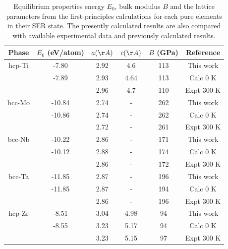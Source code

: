 \newpage
\begin{table}[H]
	\caption{Equilibrium properties energy $E_{0}$, bulk modulus $B$ and the lattice parameters from the first-principles calculations for each pure elements in their SER state. The presently calculated results are also compared with available experimental data and previously calculated results.}
	\centering
	\begin{tabular}{ c c c c c c }
		\hline
		Phase & $E_{0}$ (eV/atom) & $a (\AA)$ & $c (\AA)$ & $B$ (GPa) & Reference \\
		\hline
		hcp-Ti & -7.80 & 2.92 & 4.6 & 113 & This work\\
		          & -7.89 & 2.93 & 4.64 & 113 & Calc 0 K \cite{Schmitz-Pranghe1968_792,MaterialsProject}\\
                 & & 2.96 & 4.7 & 110 & Expt 300 K \cite{Lame2011,Dobromyslov1987}\\
        bcc-Mo & -10.84 & 2.74 & - & 262 & This work\\
                  & -10.86 & 2.74 & - & 262 & Calc 0 K \cite{Chen_Y2009_794,MaterialsProject}\\
                 & & 2.72 & - & 261 & Expt 300 K \cite{Dickinson1967a,Tsai1992}\\
        bcc-Nb & -10.22 & 2.86 & - & 171 & This work\\
                   & -10.12 & 2.88 & - & 174 & Calc 0 K \cite{Neuburger1936_127,MaterialsProject}\\
                 & & 2.86 & - & 172 & Expt 300 K \cite{Bolef1961,Steinbinder1988} \\
        bcc-Ta & -11.85 & 2.87 & - & 196 & This work\\
                 & -11.85 & 2.87 & - & 194 & Calc 0 K \cite{Neuburger1936_262,MaterialsProject}\\
                 & & 2.86 & - & 196 & Expt 300 K \cite{Bolef1961,Vavilova1988}\\                     
        hcp-Zr & -8.51 & 3.04 & 4.98 & 94 & This work\\
                 & -8.55 & 3.23 & 5.17 & 94 & Calc 0 K \cite{Treco1953_964,Bergerhoff1983,Karlsruhe,MaterialsProject}\\
                 & & 3.23 & 5.15 & 97 & Expt 300 K \cite{Peng2014,Prager1994}\\
		\hline
	\end{tabular}
	\label{Ch3-table:pspureele}
\end{table}

